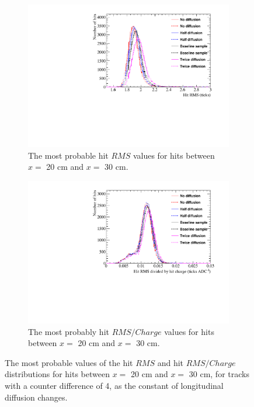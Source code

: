 \begin{figure}[h!]
  \centering
  \begin{subfigure}{0.45\textwidth}
    \centering
    \includegraphics[width=\textwidth]{Canvas_RMS_20cm_Diffusion}
    \caption{The most probable hit $RMS$ values for hits between $x =$ 20 cm and $x =$ 30 cm.}
  \end{subfigure}
  \hspace{0.08\textwidth}
  \begin{subfigure}{0.45\textwidth}
    \centering
    \includegraphics[width=\textwidth]{Canvas_RMS_Q_20cm_Diffusion}
    \caption{The most probably hit $RMS/Charge$ values for hits between $x =$ 20 cm and $x =$ 30 cm.}
  \end{subfigure}
  \caption[The most probable values of the hit $RMS$ and hit $RMS/Charge$ distributions for tracks with a counter difference of 4, as the constant of longitudinal diffusion changes]
          {The most probable values of the hit $RMS$ and hit $RMS/Charge$ distributions for hits between $x =$ 20 cm and $x =$ 30 cm, for tracks with a counter difference of 4, as the constant of longitudinal diffusion changes.}
  \label{fig:DiffLDiff_HitFit}
\end{figure}

